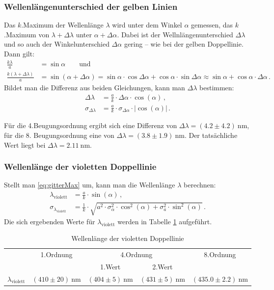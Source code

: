\documentclass[12pt,a4paper,titlepage,headinclude,bibtotoc]{scrartcl}
\begin{document}
\subsubsection{Wellenlängenunterschied der gelben Linien}
Das $k$.Maximum der Wellenlänge $\lambda$ wird unter dem Winkel $\alpha$ gemessen, das $k$.Maximum von $\lambda+\Delta\lambda$ unter $\alpha+\Delta\alpha$.
Dabei ist der Wellnlängenunterschied $\Delta\lambda$ und so auch der Winkelunterschied $\Delta\alpha$ gering -- wie bei der gelben Doppellinie.
Dann gilt:
\begin{align}
	\frac{k\lambda}{a}&=\sin\alpha\qquad\text{und} \\
	\frac{k(\lambda+\Delta\lambda)}{a}&=\sin(\alpha+\Delta\alpha) =\sin\alpha\cdot\cos\Delta\alpha +\cos\alpha\cdot\sin\Delta\alpha \approx\sin\alpha+ \cos\alpha\cdot\Delta\alpha\,.
\end{align}
Bildet man die Differenz aus beiden Gleichungen, kann man $\Delta\lambda$ bestimmen:
\begin{align}
	\Delta\lambda&=\frac{a}{k} \cdot \Delta \alpha \cdot \cos{\left (\alpha \right )}\,,\\
\sigma_{\Delta\lambda}&=\frac{a}{k} \cdot \sigma_{\Delta \alpha} \cdot \left\lvert{\cos{\left (\alpha \right )}}\right\rvert\,.
\end{align}

Für die 4.Beugungsordnung ergibt sich eine Differenz von $\Delta\lambda=(4.2 \pm 4.2)~$nm, für die 8. Beugungsordnung eine von $\Delta\lambda=(3.8 \pm 1.9)~$nm.
Der tatsächliche Wert liegt bei  $\Delta\lambda=2.11~$nm.

\subsubsection{Wellenlänge der violetten Doppellinie}
Stellt man \eqref{eq:gitterMax} um, kann man die Wellenlänge $\lambda$ berechnen:
\begin{align}
	\lambda_\text{violett}&=\frac{a}{k} \cdot \sin{\left (\alpha \right )}\,,\\
\sigma_{\lambda_\text{violett}}&=\frac{1}{k} \cdot \sqrt{a^{2} \cdot \sigma_{\alpha}^{2} \cdot \cos^{2}{\left (\alpha \right )} + \sigma_{a}^{2} \cdot \sin^{2}{\left (\alpha \right )}}\,.
\end{align}
Die sich ergebenden Werte für $\lambda_\text{violett}$ werden in Tabelle \ref{tab:violett} aufgeführt.
\begin{table}[!htb]
	\centering
	\begin{tabular}{|c|c|c|c|c|}
		\hline
		& 1.Ordnung & \multicolumn{2}{c|}{4.Ordnung} & 8.Ordnung\\
	    & & 1.Wert & 2.Wert & \\
		\hline
		$\lambda_\text{violett}$ & $(410 \pm 20)~$nm & $(404 \pm 5)~$nm & $(431 \pm 5)~$nm & $(435.0 \pm 2.2)~$nm  \\
		\hline
	\end{tabular}
	\caption{Wellenlänge der violetten Doppellinie}
	\label{tab:violett}
\end{table}
\end{document}
